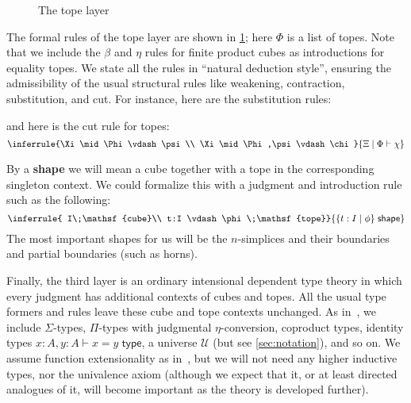 \documentclass[12pt]{amsart}
\theoremstyle{plain}
\theoremstyle{definition}
\theoremstyle{remark}
\numberwithin{equation}{section}
\newcommand{\jdeq}{\equiv}
\newcommand{\types}{\vdash}
\newcommand{\type}{\;\mathsf{type}}
\newcommand{\unittype}{\ensuremath{\mathbf{1}}}
\newcommand{\univtype}{\mathcal{U}}
\newcommand{\cube}{\;\mathsf{cube}}
\newcommand{\tope}{\;\mathsf{tope}}
\newcommand{\shape}{\;\mathsf{shape}}
\newcommand{\sh}[2]{\{#1\mid #2\}}
\newcommand{\pair}[1]{\langle #1\rangle}
\begin{document}
\begin{figure}
  \caption{The tope layer}
  \label{fig:topes}
\end{figure}

The formal rules of the tope layer are shown in \cref{fig:topes}; here $\Phi$ is a list of topes.
Note that we include the $\beta$ and $\eta$ rules for finite product cubes as introductions for equality topes.
We state all the rules in ``natural deduction style'', ensuring the admissibility of the usual structural rules like weakening, contraction, substitution, and cut.
For instance, here are the substitution rules:
and here is the cut rule for topes:
\[ \inferrule{\Xi\mid\Phi\types \psi \\ \Xi\mid\Phi,\psi\types\chi}{\Xi\mid \Phi\types \chi} \]

By a \textbf{shape} we will mean a cube together with a tope in the corresponding singleton context.
We could formalize this with a judgment and introduction rule such as the following:
\begin{equation}
  \inferrule{ I\cube \\ t:I \types \phi \tope}{\sh{t:I}{\phi} \shape}\label{eq:shape-judgment}
\end{equation}
The most important shapes for us will be the $n$-simplices and their boundaries and partial boundaries (such as horns).

Finally, the third layer is an ordinary intensional dependent type theory in which every judgment has additional contexts of cubes and topes.
All the usual type formers and rules leave these cube and tope contexts unchanged.
As in~\cite{hottbook}, we include $\Sigma$-types, $\Pi$-types with judgmental $\eta$-conversion, coproduct types, identity types $x : A, y : A \types x = y \type$, a universe $\univtype$ (but see \cref{sec:notation}), and so on.
We assume function extensionality as in~\cite[\S 2.9]{hottbook}, but we will not need any higher inductive types, nor the univalence axiom (although we expect that it, or at least directed analogues of it, will become important as the theory is developed further).
\end{document}
